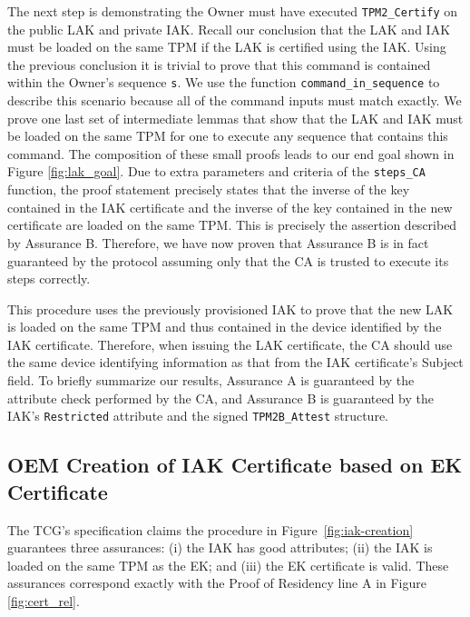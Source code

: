\documentclass[runningheads]{llncs}
\begin{document}
The next step is demonstrating the Owner must have executed
\verb|TPM2_Certify| on the public LAK and private IAK.  Recall our
conclusion that the LAK and IAK must be loaded on the same TPM if the
LAK is certified using the IAK. Using the previous conclusion it is
trivial to prove that this command is contained within the Owner's
sequence \verb|s|.  We use the function \verb|command_in_sequence| to
describe this scenario because all of the command inputs must match
exactly.  We prove one last set of intermediate lemmas that show that
the LAK and IAK must be loaded on the same TPM for one to execute any
sequence that contains this command.  The composition of these small
proofs leads to our end goal shown in Figure \ref{fig:lak_goal}. Due
to extra parameters and criteria of the \verb|steps_CA| function, the
proof statement precisely states that the inverse of the key contained
in the IAK certificate and the inverse of the key contained in the new
certificate are loaded on the same TPM.  This is precisely the
assertion described by Assurance B.  Therefore, we have now proven
that Assurance B is in fact guaranteed by the protocol assuming only
that the CA is trusted to execute its steps correctly.

This procedure uses the previously provisioned IAK to prove that the
new LAK is loaded on the same TPM and thus contained in the device
identified by the IAK certificate. Therefore, when issuing the LAK
certificate, the CA should use the same device identifying information
as that from the IAK certificate's Subject field. To briefly summarize
our results, Assurance A is guaranteed by the attribute check
performed by the CA, and Assurance B is guaranteed by the IAK's
\verb|Restricted| attribute and the signed \verb|TPM2B_Attest|
structure.

\subsection{OEM Creation of IAK Certificate based on EK Certificate}

The TCG's specification claims the procedure in
Figure~\ref{fig:iak-creation} guarantees three assurances: (i) the IAK
has good attributes; (ii) the IAK is loaded on the same TPM as the EK;
and (iii) the EK certificate is valid. These assurances correspond
exactly with the Proof of Residency line A in Figure
\ref{fig:cert_rel}.
\end{document}
